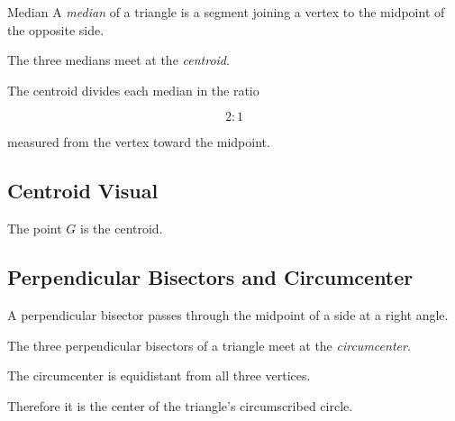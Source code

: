 \begin{definitionbox}{Median}
A \emph{median} of a triangle is a segment joining a vertex to the midpoint
of the opposite side.
\end{definitionbox}

The three medians meet at the \emph{centroid}.

The centroid divides each median in the ratio

\[ \boxed{2:1} \]

measured from the vertex toward the midpoint.

\subsection{Centroid Visual}
\label{subsec:centroid-visual}

\begin{centereddiagram}
\end{centereddiagram}

The point \(G\) is the centroid.

\subsection{Perpendicular Bisectors and Circumcenter}
\label{subsec:circumcenter}

A perpendicular bisector passes through the midpoint of a side at a right
angle.

The three perpendicular bisectors of a triangle meet at the
\emph{circumcenter}.

The circumcenter is equidistant from all three vertices.

Therefore it is the center of the triangle's circumscribed circle.

